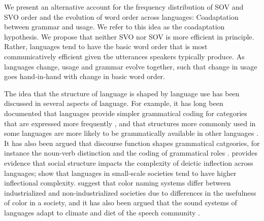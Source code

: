 \documentclass[11pt,a4paper]{article}
\begin{document}


We present an alternative account for the frequency distribution of SOV and SVO order and the evolution of word order across languages:
Coadaptation between grammar and usage. We refer to this idea as the coadaptation hypothesis. We propose that neither SVO nor SOV is more efficient in principle.
Rather, languages tend to have the basic word order that is most communicatively efficient given the utterances speakers typically produce.
As languages change, usage and grammar evolve together, such that change in usage goes hand-in-hand with change in basic word order.


The idea that the structure of language is shaped by language use has been discussed in several aspects of language.
For example, it has long been documented that languages provide simpler grammatical coding for categories that are expressed more frequently \citep{greenberg1966language, haspelmath2006against}, and that structures more commonly used in some languages are more likely to be grammatically available in other languages \citep{keenan1975variation}.
It has also been argued that discourse function shapes grammatical catgeories, for instance the noun-verb distinction \citep{hopper1984the} and the coding of grammatical roles \citep{bois1987the}.
\citet{perkins1992deixis} provides evidence that social structure impacts the complexity of deictic inflection across languages; \citet{lupyan2010language} show that languages in small-scale societies tend to have higher inflectional complexity.
\cite{gibson2017color} suggest that color naming systems differ between industrialized and non-industrialized societies due to differences in the usefulness of color in a society, and it has also been argued that the sound systems of languages adapt to climate and diet of the speech community \citep{everett2015climate,blasi2019human}.



\end{document}
